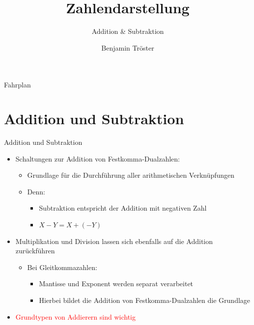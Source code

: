 \documentclass[12pt%
,xcolor=table
,aspectratio=169%
]{beamer}
\author{Benjamin Tröster}
\title[Zahlendarstellung]{Zahlendarstellung}
\subtitle[Addition \& Subtraktion]{Addition \& Subtraktion}
\institute[HTW Berlin]{Hochschule für Technik und Wirtschaft Berlin}
\begin{document}
\begin{frame}
\titlepage
\end{frame}

\begin{frame}{Fahrplan}
\tableofcontents[hideothersubsections]
\end{frame}

\section{Addition und Subtraktion}
\begin{frame}{Addition und Subtraktion}
\begin{itemize}
	\item Schaltungen zur Addition von Festkomma-Dualzahlen:
	\begin{itemize}
		\item Grundlage für die Durchführung aller arithmetischen Verknüpfungen
		\item Denn:
		\begin{itemize}
			\item Subtraktion entspricht der Addition mit negativen Zahl
			\item $X - Y = X + (-Y)$
		\end{itemize}
	\end{itemize}
	\item Multiplikation und Division lassen sich ebenfalls auf die Addition zurückführen
	\begin{itemize}
		\item Bei Gleitkommazahlen:
		\begin{itemize}
			\item Mantisse und Exponent werden separat verarbeitet
			\item Hierbei bildet die Addition von Festkomma-Dualzahlen die Grundlage
		\end{itemize}
	\end{itemize}
	\item \textcolor{red}{Grundtypen von Addierern sind wichtig}
\end{itemize}
\end{frame}
\end{document}
